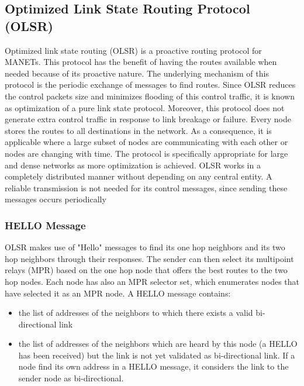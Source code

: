 \documentclass[12pt,a4paper]{report}
\begin{document}
\subsection{Optimized Link State Routing Protocol (OLSR)}
Optimized link state routing (OLSR) is a proactive routing protocol for MANETs.
This protocol has the benefit of having the routes available when needed because
of its proactive nature. The underlying mechanism of this protocol is the periodic
exchange of messages to find routes. Since OLSR reduces the control packets size
and minimizes flooding of this control traffic, it is known as optimization of a pure
link state protocol. Moreover, this protocol does not generate extra control traffic in
response to link breakage or failure. Every node stores the routes to all destinations
in the network. As a consequence, it is applicable where a large subset of nodes
are communicating with each other or nodes are changing with time. The protocol is
specifically appropriate for large and dense networks as more optimization is achieved.
OLSR works in a completely distributed manner without depending on any central
entity. A reliable transmission is not needed for its control messages, since sending
these messages occurs periodically




\subsubsection{HELLO Message}
OLSR makes use of "Hello" messages to find its one hop neighbors and its two hop neighbors through their responses. The sender can then select its multipoint relays (MPR) based on the one hop node that offers the best routes to the two hop nodes. Each node has also an MPR selector set, which enumerates nodes that have selected it as an MPR node. A HELLO message contains:
\begin{itemize}
\item the list of addresses of the neighbors to which there exists a valid bi-directional link
\item the list of addresses of the neighbors which are heard by this node (a HELLO has been received) but the link is not yet validated as bi-directional link. If a node find its own address in a HELLO message, it considers the link to the sender node as bi-directional.
\end{itemize}
\end{document}
